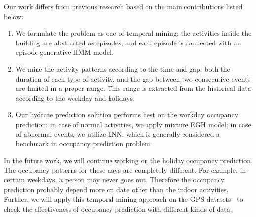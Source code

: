 Our work differs from previous research based on the main contributions listed below:
\begin{enumerate}
\item We formulate the problem as one of temporal mining: the activities inside the building are abstracted as episodes, and each episode is connected with an episode generative HMM model.
\item We mine the activity patterns according to the time and gap: both the duration of each type of 
activity, and the gap between two consecutive events are limited in a proper range. 
This range is extracted from the historical data according to the weekday and holidays.
\item Our hydrate prediction solution performs best on the workday occupancy prediction: 
in case of normal activities, we apply mixture EGH model; 
in case of abnormal events, we utilize kNN,  
which is generally considered a benchmark in occupancy prediction problem. 
\end{enumerate}

In the future work, we will continue working on the holiday occupancy prediction. 
The occupancy patterns for these days are completely different. 
For example, in certain weekdays, a person may never goes out. 
Therefore the occupancy prediction probably depend more on date other than the indoor activities. 
Further, we will apply this temporal mining approach on the GPS datasets~\cite{koehler2013therml}
to check the effectiveness of occupancy prediction with different kinds of data. 